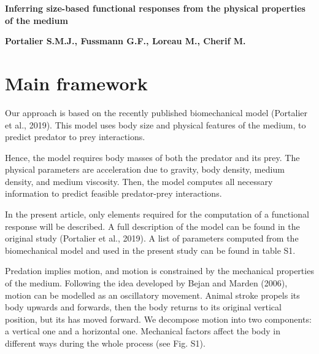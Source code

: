 \documentclass[utf8, 12 pt]{frontiers_suppmat}
\begin{document}
\onecolumn
{}

\title[Supplementary Material]{{}}


\maketitle

\begin{Large}
\textbf{Inferring size-based functional responses from the physical properties of the medium}
\end{Large}

\begin{large}
\begin{center}
\textbf{Portalier S.M.J., Fussmann G.F., Loreau M., Cherif M.}
\end{center}
\end{large}

\vspace{2 cm}

\section{Main framework}

Our approach is based on the recently published biomechanical model (Portalier et al., 2019)⁠. This model uses body size and physical features of the medium, to predict predator to prey interactions. \par
Hence, the model requires body masses of both the predator and its prey. The physical parameters are acceleration due to gravity, body density, medium density, and medium viscosity. Then, the model computes all necessary information to predict feasible predator-prey interactions.  \par
In the present article, only elements required for the computation of a functional response will be described. A full description of the model can be found in the original study (Portalier et al., 2019)⁠. A list of parameters computed from the biomechanical model and used in the present study can be found in table S1.\par
Predation implies motion, and motion is constrained by the mechanical properties of the medium. Following the idea developed by Bejan and Marden (2006), motion can be modelled as an oscillatory movement. Animal stroke propels its body upwards and forwards, then the body returns to its original vertical position, but its has moved forward. We decompose motion into two components: a vertical one and a horizontal one. Mechanical factors affect the body in different ways during the whole process (see Fig. S1).
\end{document}
